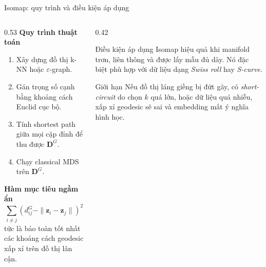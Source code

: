 \begin{frame}[shrink=8]{Isomap: quy trình và điều kiện áp dụng}
    \begin{columns}[T]
        \begin{column}{0.53\textwidth}
            {\bfseries Quy trình thuật toán}
            \begin{enumerate}
                \item Xây dựng đồ thị k-NN hoặc $\varepsilon$-graph.
                \item Gán trọng số cạnh bằng khoảng cách Euclid cục bộ.
                \item Tính shortest path giữa mọi cặp đỉnh để thu được $\mathbf{D}^G$.
                \item Chạy classical MDS trên $\mathbf{D}^G$.
            \end{enumerate}

            \vspace{0.15cm}
            {\bfseries Hàm mục tiêu ngầm ẩn}
            \[
                \sum_{i\neq j}\left(d_{ij}^{G}-\|\mathbf{z}_i-\mathbf{z}_j\|\right)^2
            \]
            tức là bảo toàn tốt nhất các khoảng cách geodesic xấp xỉ trên đồ thị lân cận.
        \end{column}

        \begin{column}{0.42\textwidth}
            \begin{block}{Điều kiện áp dụng}
                \small
                Isomap hiệu quả khi manifold trơn, liên thông và được lấy mẫu đủ dày. Nó đặc biệt phù hợp với dữ liệu dạng \emph{Swiss roll} hay \emph{S-curve}.
            \end{block}

            \begin{alertblock}{Giới hạn}
                \small
                Nếu đồ thị láng giềng bị đứt gãy, có \emph{short-circuit} do chọn $k$ quá lớn, hoặc dữ liệu quá nhiễu, xấp xỉ geodesic sẽ sai và embedding mất ý nghĩa hình học.
            \end{alertblock}
        \end{column}
    \end{columns}

    \hfill{\scriptsize \cite{tenenbaum2000global,duchesnay2021statsml}}
\end{frame}

